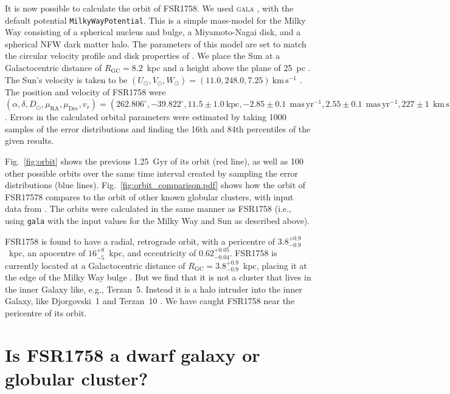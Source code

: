 \documentclass[fleqn,usenatbib,letters]{mnras}
\newcommand{\kms}{~\ensuremath{\textrm{km}\,\textrm{s}^{-1}}}
\newcommand{\masyr}{~\ensuremath{\textrm{mas}\,\textrm{yr}^{-1}}}
\begin{document}
It is now possible to calculate the orbit of FSR1758. We used \textsc{gala} \citep[version 0.3;][]{Price-Whelan2017a,Price-Whelan2018b}, with the default potential \texttt{MilkyWayPotential}. This is a simple mass-model for the Milky Way consisting of a spherical nucleus and bulge, a Miyamoto-Nagai disk, and a spherical NFW dark matter halo. The parameters of this model are set to match the circular velocity profile and disk properties of \citet{Bovy:2015gg}. We place the Sun at a Galactocentric distance of $R_\mathrm{GC}=8.2$~kpc and a height above the plane of 25~pc \citep{BlandHawthorn:2016iq}. The Sun's velocity is taken to be $(U_\odot,V_\odot,W_\odot)=(11.0,248.0,7.25)\kms$ \citep{Schonrich2012}. The position and velocity of FSR1758 were $(\alpha,\delta,D_\odot,\mu_\mathrm{RA},\mu_\mathrm{Dec},v_r)=(262.806^\circ,-39.822^\circ,11.5\pm1.0~\mathrm{kpc},-2.85\pm0.1~\mathrm{\masyr},2.55\pm0.1~\mathrm{\masyr},227\pm1~\mathrm{\kms})$. Errors in the calculated orbital parameters were estimated by taking 1000 samples of the error distributions and finding the 16th and 84th percentiles of the given results.

Fig.\ \ref{fig:orbit} shows the previous 1.25~Gyr of its orbit (red line), as well as 100 other possible orbits over the same time interval created by sampling the error distributions (blue lines). Fig.\ \ref{fig:orbit_comparison.pdf} shows how the orbit of FSR17578 compares to the orbit of other known globular clusters, with input data from \citet{Vasiliev:2018uf}. The orbits were calculated in the same manner as FSR1758 (i.e., using \texttt{gala} with the input values for the Milky Way and Sun as described above).

FSR1758 is found to have a radial, retrograde orbit, with a pericentre of $3.8_{-0.9}^{+0.9}$~kpc, an apocentre of $16_{-5}^{+8}$~kpc, and eccentricity of $0.62_{-0.04}^{+0.05}$.  FSR1758 is currently located at a Galactocentric distance of $R_\mathrm{GC} = 3.8_{-0.9}^{+0.9}$~kpc, placing it at the edge of the Milky Way bulge \citep[clusters within $\sim3$~kpc of the Galactic centre tend to be classified as `bulge' clusters;][]{Barbuy2018}. But we find that it is not a cluster that lives in the inner Galaxy like, e.g., Terzan~5. Instead it is a halo intruder into the inner Galaxy, like Djorgovski~1 and Terzan~10 \citep{Ortolani2019}. We have caught FSR1758 near the pericentre of its orbit.

\section{Is FSR1758 a dwarf galaxy or globular cluster?}\label{sec:halo}
\end{document}

